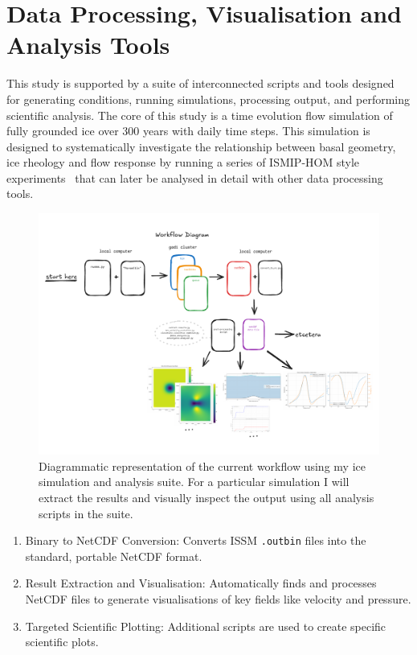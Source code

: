 \section{Data Processing, Visualisation and Analysis Tools}\label{analysis_tools}
This study is supported by a suite of interconnected scripts and tools designed for generating conditions, running simulations, processing output, and performing scientific analysis.
The core of this study is a time evolution flow simulation of fully grounded ice over 300 years with daily time steps. This simulation is designed to systematically investigate the relationship between basal geometry, ice rheology and flow response by running a series of ISMIP-HOM style experiments~\cite{Pattyn_2008} that can later be analysed in detail with other data processing tools.
\begin{figure}[H]
    \includegraphics[scale=0.55]{figures/workflow_diagram.pdf}
    \caption{Diagrammatic representation of the current workflow using my ice simulation and analysis suite. For a particular simulation I will extract the results and visually inspect the output using  all analysis scripts in the suite.}\label{fig:workflow}
\end{figure}
\begin{enumerate}
\item{Binary to NetCDF Conversion}: Converts ISSM \texttt{.outbin} files into the standard, portable NetCDF format.
\item{Result Extraction and Visualisation}: Automatically finds and processes NetCDF files to generate visualisations of key fields like velocity and pressure. 
\item{Targeted Scientific Plotting}: Additional scripts are used to create specific scientific plots.
\end{enumerate}
